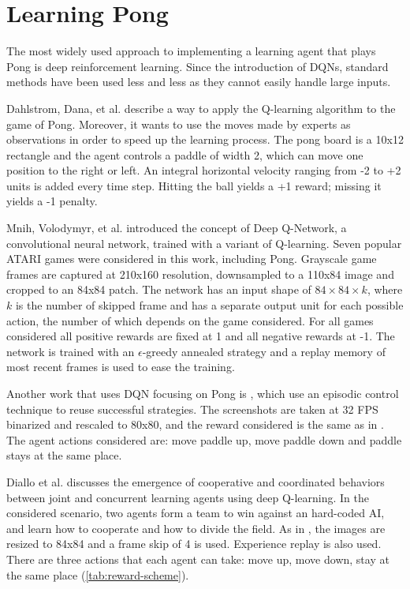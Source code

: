 \section{Learning Pong}
\label{sec:pong}
The most widely used approach to implementing a learning agent that plays Pong is deep reinforcement learning.
Since the introduction of DQNs, standard methods have been used less and less as they cannot easily handle large inputs.


Dahlstrom, Dana, et al. \cite{dahlstrom2002imitative} describe a way to apply the Q-learning algorithm to the game of Pong. Moreover, it wants to use the moves made by experts as observations in order to speed up the learning process. 
The pong board is a 10x12 rectangle and the agent controls a paddle of width 2, which can move one position to the right or left.
An integral horizontal velocity ranging from -2 to +2 units is added every time step. Hitting the ball yields a +1 reward; missing it yields a -1 penalty.

Mnih, Volodymyr, et al. \cite{mnih2013playing} introduced the concept of Deep Q-Network, a convolutional neural network, trained with a variant of Q-learning.
Seven popular ATARI games were considered in this work, including Pong.
%
Grayscale game frames are captured at 210x160 resolution, downsampled to a 110x84 image and cropped to an 84x84 patch.
%
The network has an input shape of $84\times 84\times k$, where $k$ is the number of skipped frame and has a separate output unit for each possible action, 
the number of which depends on the game considered. 
For all games considered all positive rewards are fixed at 1 and all negative rewards at -1.
%
The network is trained with an $\epsilon$-greedy annealed strategy and a replay memory of most recent frames is used to ease the training.

Another work that uses DQN focusing on Pong is \cite{makarov2017learning}, which use an episodic control technique \cite{blundell2016model} to reuse successful
strategies.
%
The screenshots are taken at 32 FPS binarized and rescaled to 80x80, and the reward considered is the same as in \cite{mnih2013playing}.
The agent actions considered are: move paddle up, move paddle down and paddle stays at the same place.

Diallo et al. \cite{diallo2017learning} discusses the emergence of cooperative and coordinated behaviors between joint and concurrent learning
agents using deep Q-learning. 
%
In the considered scenario, two agents form a team to win against an hard-coded AI,
and learn how to cooperate and how to divide the field.
%
As in \cite{mnih2013playing}, the images are resized to 84x84 and a frame skip of 4 is used.
Experience replay is also used.
%
There are three actions that each agent can take: move up, move down, stay at the same place (\cref{tab:reward-scheme}).

